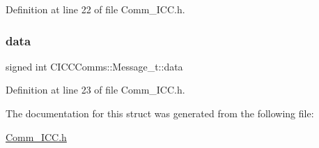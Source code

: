 Definition at line 22 of file Comm\+\_\+\+I\+C\+C.\+h.

\mbox{\label{struct_c_i_c_c_comms_1_1_message__t_a25cfce11e78d103524b695b281629d75}} 
\subsubsection{\texorpdfstring{data}{data}}
{\footnotesize\ttfamily signed int C\+I\+C\+C\+Comms\+::\+Message\+\_\+t\+::data}



Definition at line 23 of file Comm\+\_\+\+I\+C\+C.\+h.



The documentation for this struct was generated from the following file\+:\begin{DoxyCompactItemize}
\item 
\mbox{\hyperlink{_comm___i_c_c_8h}{Comm\+\_\+\+I\+C\+C.\+h}}\end{DoxyCompactItemize}
